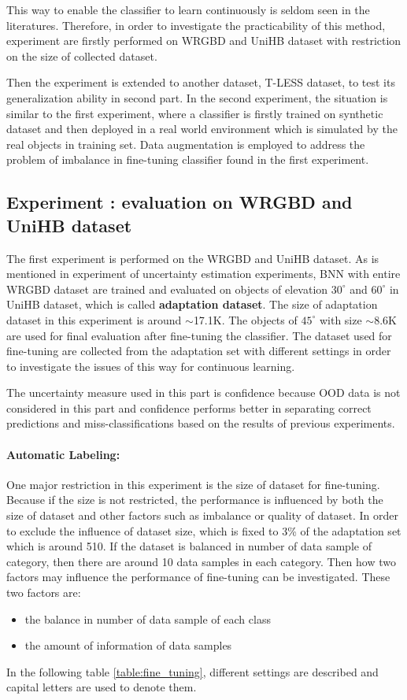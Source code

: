 This way to enable the classifier to learn continuously is seldom seen in the literatures. Therefore, in order to investigate the practicability of this method, experiment are firstly performed on WRGBD and UniHB dataset with restriction on the size of collected dataset. 

Then the experiment is extended to another dataset, T-LESS dataset, to test its generalization ability in second part. In the second experiment, the situation is similar to the first experiment, where a classifier is firstly trained on synthetic dataset and then deployed in a real world environment which is simulated by the real objects in training set.  Data augmentation is employed to address the problem of imbalance in fine-tuning classifier found in the first experiment.
 
\subsection{Experiment : evaluation on WRGBD and UniHB dataset}
The first experiment is performed on the \gls{WRGBD} and UniHB dataset. As is mentioned in experiment  of uncertainty estimation experiments, \gls{BNN} with entire \gls{WRGBD} dataset are trained and evaluated on objects of elevation $30^{\circ}$ and $60^{\circ}$ in UniHB dataset, which is called \textbf{adaptation dataset}. The size of adaptation dataset in this experiment is around $\sim$17.1K. The objects of $45^{\circ}$ with size $\sim$8.6K are used for final evaluation after fine-tuning the classifier. The dataset used for fine-tuning are collected from the adaptation set with different settings in order to investigate the issues of this way for continuous learning. 

The uncertainty measure used in this part is confidence because OOD data is not considered in this part and confidence performs better in separating correct predictions and miss-classifications based on the results of previous experiments.

\paragraph{Automatic Labeling:}One major restriction in this experiment is the size of dataset for fine-tuning. Because if the size is not restricted, the performance is influenced by both the size of dataset and other factors such as imbalance or quality of dataset. In order to exclude the influence of dataset size, which is fixed to 3\% of the adaptation set which is around 510. If the dataset is balanced in number of data sample of category, then there are around 10 data samples in each category. Then how two factors may influence the performance of fine-tuning can be investigated. 
These two factors are:
\begin{itemize}
	\item the balance in number of data sample of each class 
	\item the amount of information of data samples
\end{itemize}
In the following table \ref{table:fine_tuning}, different settings are described and capital letters are used to denote them.

